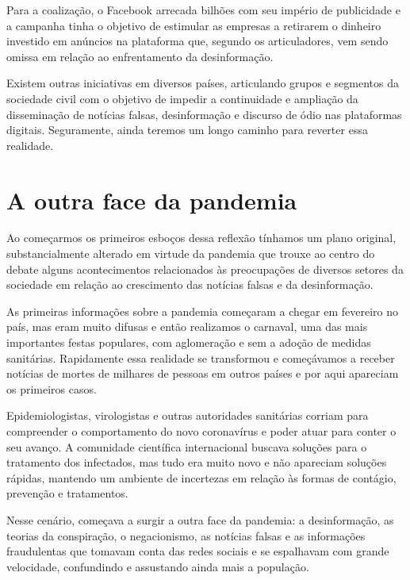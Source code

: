 Para a coalização, o Facebook arrecada bilhões com seu império de
publicidade e a campanha tinha o objetivo de estimular as empresas a
retirarem o dinheiro investido em anúncios na plataforma que, segundo os
articuladores, vem sendo omissa em relação ao enfrentamento da
desinformação.

Existem outras iniciativas em diversos países, articulando grupos e
segmentos da sociedade civil com o objetivo de impedir a continuidade e
ampliação da disseminação de notícias falsas, desinformação e discurso
de ódio nas plataformas digitais. Seguramente, ainda teremos um longo
caminho para reverter essa realidade.

\chapter{A outra face da pandemia}

Ao começarmos os primeiros esboços dessa reflexão tínhamos um plano
original, substancialmente alterado em virtude da pandemia que trouxe ao
centro do debate alguns acontecimentos relacionados às preocupações de
diversos setores da sociedade em relação ao crescimento das notícias
falsas e da desinformação.

As primeiras informações sobre a pandemia começaram a chegar em
fevereiro no país, mas eram muito difusas e então realizamos o carnaval,
uma das mais importantes festas populares, com aglomeração e sem a
adoção de medidas sanitárias. Rapidamente essa realidade se transformou
e começávamos a receber notícias de mortes de milhares de pessoas em
outros países e por aqui apareciam os primeiros casos.

Epidemiologistas, virologistas e outras autoridades sanitárias corriam
para compreender o comportamento do novo coronavírus e poder atuar para
conter o seu avanço. A comunidade científica internacional buscava
soluções para o tratamento dos infectados, mas tudo era muito novo e não
apareciam soluções rápidas, mantendo um ambiente de incertezas em
relação às formas de contágio, prevenção e tratamentos.

Nesse cenário, começava a surgir a outra face da pandemia: a
desinformação, as teorias da conspiração, o negacionismo, as notícias
falsas e as informações fraudulentas que tomavam conta das redes sociais
e se espalhavam com grande velocidade, confundindo e assustando ainda
mais a população.


